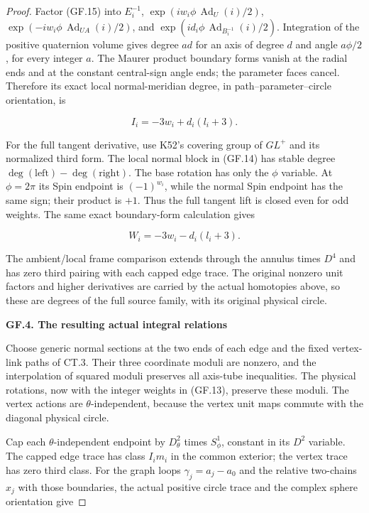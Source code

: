 \begin{proof}
Factor (GF.15) into \(E_i^{-1}\), \(\exp(iw_i\phi\,\operatorname{Ad}_U(i)/2)\),
\(\exp(-iw_i\phi\,\operatorname{Ad}_{UA}(i)/2)\), and
\(\exp(id_i\phi\,\operatorname{Ad}_{B_i^{-1}}(i)/2)\). Integration of the positive
quaternion volume gives degree \(ad\) for an axis of degree \(d\) and
angle \(a\phi/2\), for every integer \(a\). The Maurer product boundary
forms vanish at the radial ends and at the constant central-sign
angle ends; the parameter faces cancel. Therefore its exact local
normal-meridian degree, in path--parameter--circle orientation, is

\[
                         I_i=-3w_i+d_i(l_i+3).         \tag{GF.16}
\]

For the full tangent derivative, use K52's covering group of
\(GL^+\) and its normalized third form. The local normal block in
(GF.14) has stable degree \(\deg(\mathrm{left})-\deg(\mathrm{right})\). The base rotation
has only the \(\phi\) variable. At \(\phi=2\pi\) its Spin endpoint is
\((-1)^{w_i}\), while the normal Spin endpoint has the same sign;
their product is \(+1\). Thus the full tangent lift is closed even
for odd weights. The same exact boundary-form calculation gives

\[
                         W_i=-3w_i-d_i(l_i+3).         \tag{GF.17}
\]

The ambient/local frame comparison extends through the annulus
times \(D^4\) and has zero third pairing with each capped edge trace.
The original nonzero unit factors and higher derivatives are
carried by the actual homotopies above, so these are degrees of
the full source family, with its original physical circle.

\par

\medskip\noindent\textbf{GF.4. The resulting actual integral relations}

\par\nobreak

Choose generic normal sections at the two ends of each edge and
the fixed vertex-link paths of CT.3. Their three coordinate
moduli are nonzero, and the interpolation of squared moduli
preserves all axis-tube inequalities. The physical rotations,
now with the integer weights in (GF.13), preserve these moduli.
The vertex actions are \(\theta\)-independent, because the vertex
unit maps commute with the diagonal physical circle.

Cap each \(\theta\)-independent endpoint by \(D^2_\theta\) times \(S^1_\phi\),
constant in its \(D^2\) variable. The capped edge trace has class
\(I_im_i\) in the common exterior; the vertex trace has zero third
class. For the graph loops \(\gamma_j=a_j-a_0\) and the relative
two-chains \(x_j\) with those boundaries, the actual positive circle
trace and the complex sphere orientation give


\end{proof}
